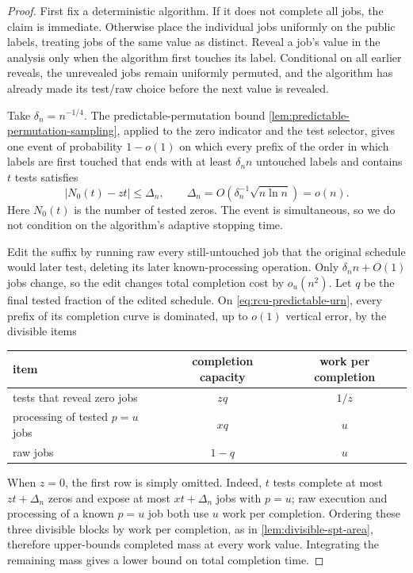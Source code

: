 \begin{proof}
First fix a deterministic algorithm.  If it does not complete all jobs, the
claim is immediate.  Otherwise place the individual jobs uniformly on the
public labels, treating jobs of the same value as distinct.  Reveal a job's
value in the analysis only when the algorithm first touches its label.
Conditional on all earlier reveals, the unrevealed jobs remain uniformly
permuted, and the algorithm has already made its test/raw choice before the
next value is revealed.

Take $\delta_n=n^{-1/4}$.  The predictable-permutation bound
\cref{lem:predictable-permutation-sampling}, applied to the zero indicator
and the test selector, gives one event of probability $1-o(1)$ on which
every prefix of the order in which labels are first touched that ends with at
least $\delta_n n$ untouched labels and contains $t$ tests
satisfies
\begin{equation}
 \bigl|N_0(t)-zt\bigr|\le
 \Delta_n,
 \qquad
 \Delta_n=O(\delta_n^{-1}\sqrt{n\ln n})=o(n).
 \label{eq:rcu-predictable-urn}
\end{equation}
Here $N_0(t)$ is the number of tested zeros.  The event is simultaneous, so
we do not condition on the algorithm's adaptive stopping time.

Edit the suffix by running raw every still-untouched job that the original
schedule would later test, deleting its later known-processing operation.
Only $\delta_n n+O(1)$ jobs change, so the edit changes total completion cost
by $o_u(n^2)$.  Let $q$ be the final tested fraction of the edited schedule.
On \eqref{eq:rcu-predictable-urn}, every prefix of its completion curve is
dominated, up to $o(1)$ vertical error, by the divisible items
\begin{center}
\begin{tabular}{@{}lcc@{}}
\toprule
item & completion capacity & work per completion\\
\midrule
tests that reveal zero jobs & $zq$ & $1/z$\\
processing of tested $p=u$ jobs & $xq$ & $u$\\
raw jobs & $1-q$ & $u$\\
\bottomrule
\end{tabular}
\end{center}
When $z=0$, the first row is simply omitted.
Indeed, $t$ tests complete at most $zt+\Delta_n$ zeros and expose at most
$xt+\Delta_n$ jobs with $p=u$; raw execution and processing of a known
$p=u$ job both use $u$ work per completion.  Ordering these three divisible
blocks by work per completion,
as in \cref{lem:divisible-spt-area}, therefore upper-bounds completed mass at every
work value.  Integrating the remaining mass gives a lower bound on total
completion time.


\end{proof}
